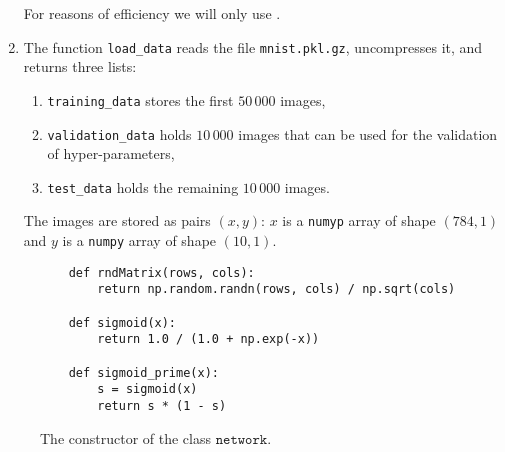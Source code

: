 \begin{enumerate}
      For reasons of efficiency we will only use . 
\item The function \texttt{load\_data} reads the file \texttt{mnist.pkl.gz}, uncompresses it,
      and returns three lists:
      \begin{enumerate}
      \item \texttt{training\_data} stores the first $50\,000$ images,
      \item \texttt{validation\_data} holds $10\,000$ images that can be used for the validation of
            hyper-parameters,   
      \item \texttt{test\_data} holds the remaining $10\,000$ images.
      \end{enumerate}
      The images are stored as pairs $(x,y)$: $x$ is a \texttt{numyp} array of shape $(784,1)$ and $y$ is a
      \texttt{numpy} array of shape $(10, 1)$.
\end{enumerate}

\begin{figure}[!ht]
\centering
\begin{verbatim}
    def rndMatrix(rows, cols):
        return np.random.randn(rows, cols) / np.sqrt(cols)

    def sigmoid(x):
        return 1.0 / (1.0 + np.exp(-x))    
    
    def sigmoid_prime(x):
        s = sigmoid(x)
        return s * (1 - s)
\end{verbatim}
\vspace*{-0.3cm}
\caption{The constructor of the class $\mathtt{network}$.}
\label{fig:Digit-Regocnition.ipynb-2}
\end{figure}

